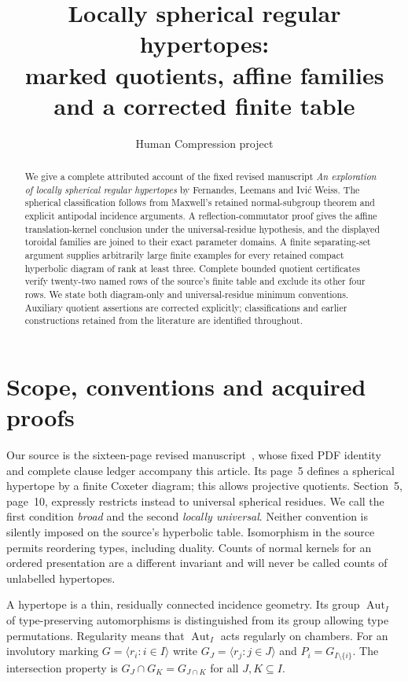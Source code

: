 \documentclass[11pt,a4paper]{article}
\title{Locally spherical regular hypertopes:\\marked quotients, affine families and a corrected finite table}
\author{Human Compression project}
\date{}
\newcommand{\gen}[1]{\langle #1\rangle}
\newcommand{\Aut}{\operatorname{Aut}}
\begin{document}
\maketitle
\begin{abstract}
We give a complete attributed account of the fixed revised manuscript
\emph{An exploration of locally spherical regular hypertopes} by Fernandes,
Leemans and Ivi\'c Weiss. The spherical classification follows from Maxwell's
retained normal-subgroup theorem and explicit antipodal incidence arguments.
A reflection-commutator proof gives the affine translation-kernel conclusion
under the universal-residue hypothesis, and the displayed toroidal families
are joined to their exact parameter domains. A finite separating-set argument
supplies arbitrarily large finite examples for every retained compact
hyperbolic diagram of rank at least three. Complete bounded quotient
certificates verify twenty-two named rows of the source's finite table and
exclude its other four rows. We state both diagram-only and universal-residue
minimum conventions. Auxiliary quotient assertions are corrected explicitly;
classifications and earlier constructions retained from the literature are
identified throughout.
\end{abstract}

\section{Scope, conventions and acquired proofs}\label{scope}
Our source is the sixteen-page revised manuscript~\cite{FLW}, whose fixed
PDF identity and complete clause ledger accompany this article. Its page~5
defines a spherical hypertope by a finite Coxeter diagram; this allows
projective quotients. Section~5, page~10, expressly restricts instead to
universal spherical residues. We call the first condition \emph{broad} and
the second \emph{locally universal}. Neither convention is silently imposed
on the source's hyperbolic table. Isomorphism in the source permits reordering
types, including duality. Counts of normal kernels for an ordered presentation
are a different invariant and will never be called counts of unlabelled
hypertopes.

A hypertope is a thin, residually connected incidence geometry. Its group
$\Aut_I$ of type-preserving automorphisms is distinguished from its group
allowing type permutations. Regularity means that $\Aut_I$ acts regularly
on chambers. For an involutory marking $G=\gen{r_i:i\in I}$ write
$G_J=\gen{r_j:j\in J}$ and $P_i=G_{I\setminus\{i\}}$. The intersection
property is $G_J\cap G_K=G_{J\cap K}$ for all $J,K\subseteq I$.
\end{document}
